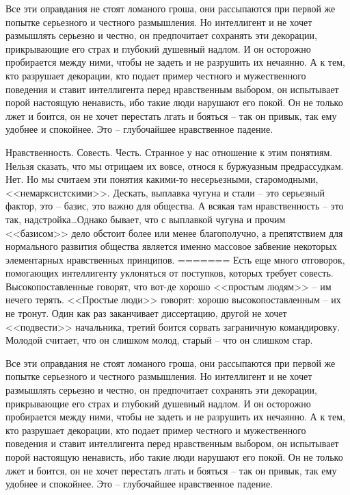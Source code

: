 \documentclass{book}
\begin{document}
Все эти оправдания не стоят ломаного гроша, они рассыпа­ются при первой же попытке серьезного и честного размышле­ния. Но интеллигент и не хочет размышлять серьезно и честно, он предпочитает сохранять эти декорации, прикрывающие его страх и глубокий душевный надлом. И он осторожно пробирается между ними, чтобы не задеть и не разрушить их нечаянно. А к тем, кто разрушает декорации, кто подает пример честного и мужественного поведения и ставит интеллигента перед нравственным выбором, он испытывает порой настоящую ненависть, ибо такие люди нарушают его покой. Он не только лжет и боится, он не хочет перестать лгать и бояться -- так он привык, так ему удобнее и спокойнее. Это -- глубочайшее нравственное падение.

Нравственность. Совесть. Честь. Странное у нас отношение к этим понятиям. Нельзя сказать, что мы отрицаем их вовсе, относя к буржуазным предрассудкам. Нет. Но мы считаем эти понятия какими‑то несерьезными, старомодными, <<немарксистскими>>. Дескать, выплавка чугуна и стали -- это серьезный фактор, это -- базис,  это важно для общества. А всякая там нравственность -- это так, надстройка\ldots  Однако бывает, что с выплавкой чугуна и прочим <<базисом>> дело обстоит более или менее благополучно, а препятствием для нормального развития общества является именно массовое забвение некоторых элементарных нравственных принципов.
=======
Есть еще много отговорок, помогающих интеллигенту уклоняться от поступков, которых требует совесть. Высокопоставленные говорят, что вот-де хорошо <<простым людям>> -- им нечего терять. <<Простые люди>> говорят: хорошо высокопоставленным -- их не тронут. Один как раз заканчивает диссер­тацию, другой не хочет <<подвести>> начальника, третий боится сорвать заграничную командировку. Молодой считает, что он слишком молод, старый -- что он слишком стар.

Все эти оправдания не стоят ломаного гроша, они рассыпа­ются при первой же попытке серьезного и честного размышле­ния. Но интеллигент и не хочет размышлять серьезно и честно, он предпочитает сохранять эти декорации, прикрывающие его страх и глубокий душевный надлом. И он осторожно пробирается между ними, чтобы не задеть и не разрушить их нечаянно. А к тем, кто разрушает декорации, кто подает пример честного и мужественного поведения и ставит интеллигента перед нравственным выбором, он испытывает порой настоящую ненависть, ибо такие люди нарушают его покой. Он не только лжет и боится, он не хочет перестать лгать и бояться -- так он привык, так ему удобнее и спокойнее. Это -- глубочайшее нравственное падение.
\end{document}

